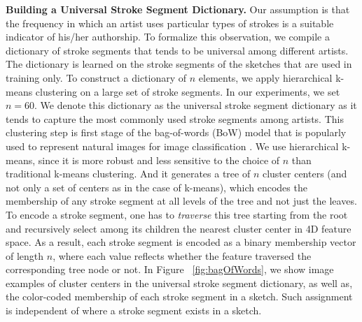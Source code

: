 \noindent\textbf{Building a Universal Stroke Segment Dictionary.} Our assumption is that the frequency in which an artist uses particular types of strokes is a suitable indicator of his/her authorship. To formalize this observation, we compile a dictionary of stroke segments that tends to be universal among different artists. The dictionary is learned on the stroke segments of the sketches that are used in training only. To construct a dictionary of $n$ elements, we apply hierarchical k-means clustering on a large set of stroke segments. In our experiments, we set $n=60$. We denote this dictionary as the universal stroke segment dictionary as it tends to capture the most commonly used stroke segments among artists. This clustering step is first stage of the bag-of-words (BoW) model that is popularly used to represent natural images for image classification \cite{Sivic03}. We use hierarchical k-means, since it is more robust and less sensitive to the choice of $n$ than traditional k-means clustering. And it generates a tree of $n$ cluster centers (and not only a set of centers as in the case of k-means), which encodes the membership of any stroke segment at all levels of the tree and not just the leaves. To encode a stroke segment, one has to \emph{traverse} this tree starting from the root and recursively select among its children the nearest cluster center in 4D feature space. As a result, each stroke segment is encoded as a binary membership vector of length $n$, where each value reflects whether the feature traversed the corresponding tree node or not. In Figure ~\ref{fig:bagOfWords}, we show image examples of cluster centers in the universal stroke segment dictionary, as well as, the color-coded membership of each stroke segment in a sketch. Such assignment is independent of where a stroke segment exists in a sketch.


